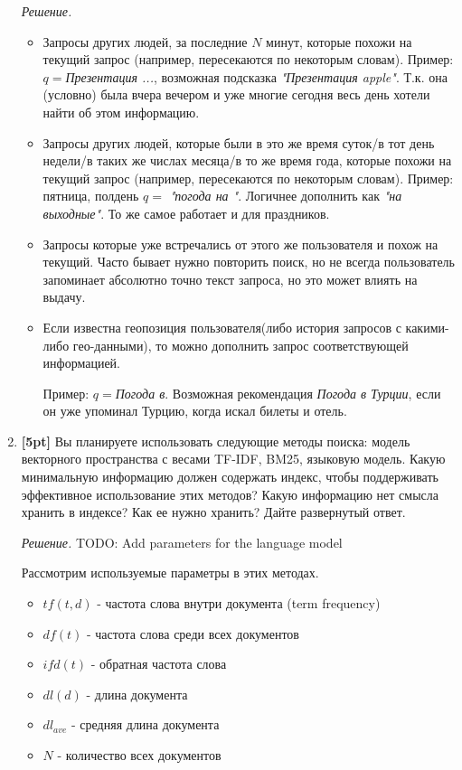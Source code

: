 \begin{enumerate}
	\textit{Решение.} 
	\begin{itemize}
		\item Запросы других людей, за последние $N$ минут, которые похожи на текущий запрос 
		(например, пересекаются по некоторым словам). Пример: $q=$\textit{Презентация ...}, 
		возможная подсказка \textit{"Презентация apple"}. Т.к. она (условно) была вчера вечером и 
		уже многие сегодня весь день хотели найти об этом информацию.
		\item Запросы других людей, которые были в это же время суток/в тот день недели/в таких 
		же числах месяца/в то же время года, которые похожи на текущий запрос (например, 
		пересекаются по некоторым словам). Пример: пятница, полдень $q=$ \textit{"погода на "}. 
		Логичнее дополнить как \textit{"на выходные"}. То же самое работает и для праздников.
		\item Запросы которые уже встречались от этого же пользователя и похож на текущий. Часто 
		бывает нужно повторить поиск, но не всегда пользователь запоминает абсолютно точно текст 
		запроса, но это может влиять на выдачу.
		\item Если известна геопозиция пользователя(либо история запросов с какими-либо 
		гео-данными), то можно дополнить запрос соответствующей информацией.
		
		Пример: $q=$\textit{Погода в}. Возможная рекомендация \textit{Погода в Турции}, если он уже 
		упоминал Турцию, когда искал билеты и отель.
	\end{itemize}
	\item \textbf{[5pt]} Вы планируете использовать следующие методы поиска: модель векторного 
	пространства с весами TF-IDF, BM25, языковую модель. Какую минимальную информацию должен 
	содержать индекс, чтобы поддерживать эффективное использование этих методов? Какую информацию 
	нет смысла хранить в индексе? Как ее нужно хранить? Дайте развернутый ответ.
	
	\textit{Решение.} TODO: Add parameters for the language model 
	
	Рассмотрим используемые параметры в этих методах.
	\begin{itemize}
		\item $tf(t, d)$ - частота слова внутри документа (term frequency)
		\item $df(t)$ - частота слова среди всех документов
		\item $ifd(t)$ - обратная частота слова
		\item $dl(d)$ - длина документа
		\item $dl_{ave}$ - средняя длина документа
		\item $N$ - количество всех документов
	\end{itemize}
	

\end{enumerate}

